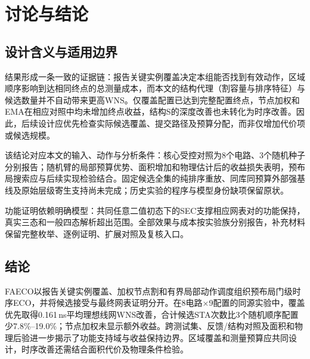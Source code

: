 \documentclass[twocolumn,10pt,fontset=windows]{ctexart}
\begin{document}
\section{讨论与结论}

\subsection{设计含义与适用边界}

结果形成一条一致的证据链：报告关键实例覆盖决定本组能否找到有效动作，区域顺序影响到达相同终点的总测量成本，而本文的结构代理（割容量与排序特征）与候选数量并不自动带来更高WNS。仅覆盖配置已达到完整配置终点，节点加权和EMA在相应对照中均未增加终点收益，结构S的深度改善也未转化为时序改善。因此，后续设计应优先检查实际候选覆盖、提交路径及预算分配，而非仅增加代价项或候选规模。

该结论对应本文的输入、动作与分析条件：核心受控对照为8个电路、3个随机种子分别报告；随机臂的局部预算优势、面积增加和物理估计后的收益损失表明，预布局搜索应与后续实现检验结合。固定候选全集的纯排序重放、同库同预算外部强基线及原始层级寄生支持尚未完成；历史实验的程序与模型身份缺项保留原状。

功能证明依赖明确模型：共同任意二值初态下的SEC支撑相应网表对的功能保持，真实三态和一般四态解析超出范围。全部效果与成本按实验族分别报告，补充材料保留完整枚举、逐例证明、扩展对照及复核入口。

\subsection{结论}

FAECO以报告关键实例覆盖、加权节点割和有界局部动作调度组织预布局门级时序ECO，并将候选接受与最终网表证明分开。在8电路$\times$9配置的同源实验中，覆盖优先取得0.161\,ns平均理想线网WNS改善，合计候选STA次数比3个随机顺序配置少7.8\%--19.0\%；节点加权未显示额外收益。跨测试集、反馈/结构对照及面积和物理后验进一步揭示了功能支持域与收益保持边界。区域覆盖和测量预算应共同设计，时序改善还需结合面积代价及物理条件检验。
\end{document}

